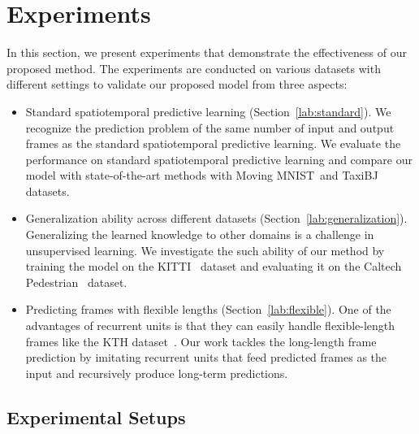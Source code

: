 \documentclass[10pt,twocolumn,letterpaper]{article}
\begin{document}
\section{Experiments} In this section, we present experiments that demonstrate the effectiveness of our proposed method. The experiments are conducted on various datasets with different settings to validate our proposed model from three aspects:
\begin{itemize}
  \item Standard spatiotemporal predictive learning (Section~\ref{lab:standard}). We recognize the prediction problem of the same number of input and output frames as the standard spatiotemporal predictive learning. We evaluate the performance on standard spatiotemporal predictive learning and compare our model with state-of-the-art methods with Moving MNIST~\cite{srivastava2015unsupervised}and TaxiBJ~\cite{zhang2017deep} datasets.
  \item Generalization ability across different datasets (Section~\ref{lab:generalization}). Generalizing the learned knowledge to other domains is a challenge in unsupervised learning. We investigate the such ability of our method by training the model on the KITTI~\cite{geiger2013vision} dataset and evaluating it on the Caltech Pedestrian~\cite{dollar2009pedestrian} dataset. 
  \item Predicting frames with flexible lengths (Section~\ref{lab:flexible}). One of the advantages of recurrent units is that they can easily handle flexible-length frames like the KTH dataset~\cite{schuldt2004recognizing}. Our work tackles the long-length frame prediction by imitating recurrent units that feed predicted frames as the input and recursively produce long-term predictions. 
\end{itemize}

\subsection{Experimental Setups}
\end{document}
